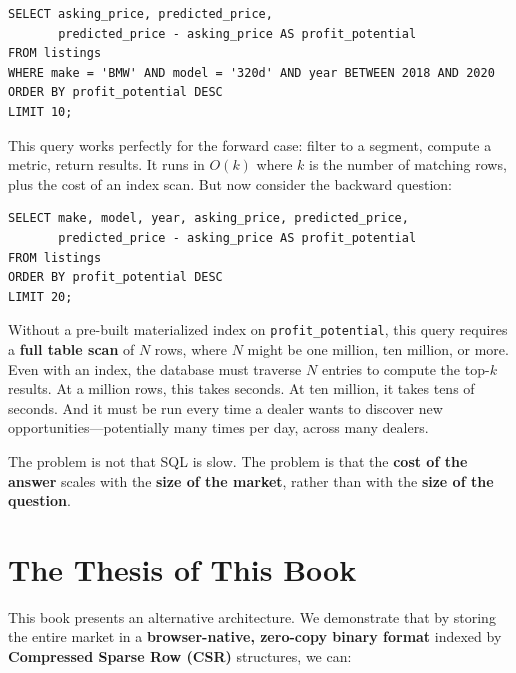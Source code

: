 \documentclass[11pt,a4paper,twoside]{book}
\begin{document}
\begin{lstlisting}[style=sql,caption={Typical listing schema in a dealer management system.}]
SELECT asking_price, predicted_price,
       predicted_price - asking_price AS profit_potential
FROM listings
WHERE make = 'BMW' AND model = '320d' AND year BETWEEN 2018 AND 2020
ORDER BY profit_potential DESC
LIMIT 10;
\end{lstlisting}

This query works perfectly for the forward case: filter to a segment, compute a metric, return
results. It runs in $O(k)$ where $k$ is the number of matching rows, plus the cost of an index
scan. But now consider the backward question:

\begin{lstlisting}[style=sql,caption={The backward query: find the best deals across all segments.}]
SELECT make, model, year, asking_price, predicted_price,
       predicted_price - asking_price AS profit_potential
FROM listings
ORDER BY profit_potential DESC
LIMIT 20;
\end{lstlisting}

Without a pre-built materialized index on \texttt{profit\_potential}, this query requires a
\textbf{full table scan} of $N$ rows, where $N$ might be one million, ten million, or more. Even
with an index, the database must traverse $N$ entries to compute the top-$k$ results. At a million
rows, this takes seconds. At ten million, it takes tens of seconds. And it must be run every time
a dealer wants to discover new opportunities---potentially many times per day, across many
dealers.

The problem is not that SQL is slow. The problem is that the \textbf{cost of the answer} scales
with the \textbf{size of the market}, rather than with the \textbf{size of the question}.

\section{The Thesis of This Book}

This book presents an alternative architecture. We demonstrate that by storing the entire market
in a \textbf{browser-native, zero-copy binary format} indexed by \textbf{Compressed Sparse Row
(CSR)} structures, we can:
\end{document}
